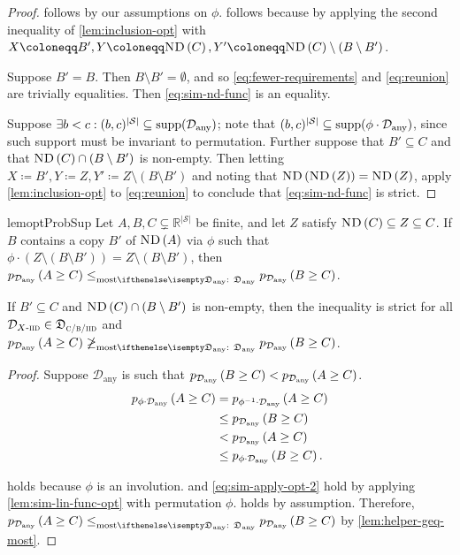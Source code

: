 \documentclass{article}
\renewcommand{\abs}[1]{\left|#1\right|}
\newcommand*{\prn}[1]{\left(#1\right)}
\newcommand*{\defeq}{\coloneqq} %
\newcommand*{\reals}{\mathbb{R}}
\newcommand*{\upsc}[1]{\text{\upshape\textsc{#1}}}
\newcommand*{\St}{\mathcal{S}}
\newcommand*{\rewardVS}{\reals^{\abs{\St}}} %
\newcommand*{\D}{\mathcal{D}} %
\newcommand*{\distSet}{\mathfrak{D}}
\newcommand*{\DSetBCiid}{\distSet_{\textsc{c/b/}\iid}}
\newcommand*{\Dany}{\D_{\text{any}}}
\newcommand*{\DSetAny}{\distSet_\text{any}}
\newcommand*{\ND}[1]{\upsc{ND}\prn{#1}}
\newcommand*{\inv}{^{-1}}
\theoremstyle{definition}
\begin{document}
\begin{appendices}
\begin{proof}
 follows by our assumptions on $\phi$.  follows because by applying the second inequality of \cref{lem:inclusion-opt} with $X\defeq B', Y\defeq \ND{C}, Y'\defeq \ND{C}\setminus (B\setminus B')$.

Suppose $B'=B$. Then $B\setminus B'=\emptyset$, and so \cref{eq:fewer-requirements} and \cref{eq:reunion} are trivially equalities. Then \cref{eq:sim-nd-func} is an equality.

Suppose $\exists b<c: (b,c)^{\abs{\St}}\subseteq \supp[\Dany]$; note that $(b,c)^{\abs{\St}}\subseteq\supp[\phi\cdot \Dany]$, since such support must be invariant to permutation. Further suppose that $B'\subseteq C$ and that $\ND{C}\cap \prn{B\setminus B'}$ is non-empty. Then letting $X\defeq B', Y\defeq Z, Y'\defeq Z\setminus (B\setminus B')$ and noting that $\ND{\ND{Z}}=\ND{Z}$, apply \cref{lem:inclusion-opt} to \cref{eq:reunion} to conclude that \cref{eq:sim-nd-func} is strict.
\end{proof}

\begin{restatable}{lem}{optProbSup}\label{lem:opt-prob-superior}
Let $A,B,C\subsetneq \rewardVS$ be finite, and let $Z$ satisfy $\ND{C}\subseteq Z \subseteq C$. If $B$ contains a copy $B'$ of $\ND{A}$ via $\phi$ such that $\phi\cdot\prn{Z\setminus \prn{B\setminus B'}}=Z\setminus \prn{B\setminus B'}$, then $\phelper{A\geq C}[\Dany] \leqMost[][\DSetAny] \phelper{B \geq C}[\Dany]$.

If $B'\subseteq C$ and $\ND{C}\cap \prn{B\setminus B'}$ is non-empty, then the inequality is strict for all $\Diid\in\DSetBCiid$ and  $\phelper{A\geq C}[\Dany] \not\geqMost[][\DSetAny] \phelper{B \geq C}[\Dany]$.
\end{restatable}
\begin{proof}
Suppose $\Dany$ is such that $\phelper{B \geq C}[\Dany] < \phelper{A\geq C}[\Dany]$. 
\begin{align}
    \phelper{A\geq C}[\phi\cdot \Dany]&=\phelper{A\geq C}[\phi\inv\cdot \Dany]\label{eq:involution-1}\\
    &\leq \phelper{B\geq C}[\Dany]\label{eq:sim-apply-opt}\\
    &< \phelper{A\geq C}[\Dany]\label{eq:assumption-apply-leq}\\
    &\leq \phelper{B\geq C}[\phi\cdot \Dany].\label{eq:sim-apply-opt-2}
\end{align}

 holds because $\phi$ is an involution.  and \cref{eq:sim-apply-opt-2} hold by applying \cref{lem:sim-lin-func-opt} with permutation $\phi$.  holds by assumption. Therefore, $\phelper{A\geq C}[\Dany] \leqMost[][\DSetAny] \phelper{B \geq C}[\Dany]$ by \cref{lem:helper-geq-most}.


\end{proof}
\end{appendices}
\end{document}
